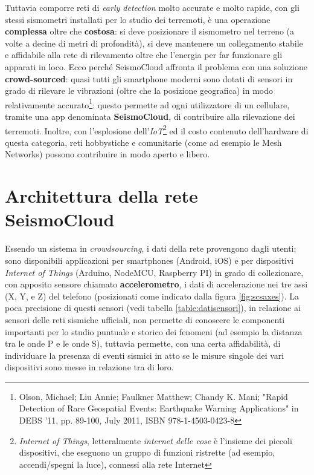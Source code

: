 \documentclass[a4paper,10pt]{memoir}
\begin{document}
Tuttavia comporre reti di \textit{early detection} molto accurate e molto rapide, con gli stessi sismometri installati per lo studio dei terremoti, è una operazione \textbf{complessa} oltre che \textbf{costosa}: si deve posizionare il sismometro nel terreno (a volte a decine di metri di profondità), si deve mantenere un collegamento stabile e affidabile alla rete di rilevamento oltre che l'energia per far funzionare gli apparati in loco. Ecco perché SeismoCloud affronta il problema con una soluzione \textbf{crowd-sourced}: quasi tutti gli smartphone moderni sono dotati di sensori in grado di rilevare le vibrazioni (oltre che la posizione geografica) in modo relativamente accurato\footnote{Olson, Michael; Liu Annie; Faulkner Matthew; Chandy K. Mani; "Rapid Detection of Rare Geospatial Events: Earthquake Warning Applications" in DEBS '11, pp. 89-100, July 2011, ISBN 978-1-4503-0423-8}: questo permette ad ogni utilizzatore di un cellulare, tramite una app denominata \textbf{SeismoCloud}, di contribuire alla rilevazione dei terremoti. Inoltre, con l'esplosione dell'\textit{IoT}\footnote{\textit{Internet of Things}, letteralmente \textit{internet delle cose} è l'insieme dei piccoli dispositivi, che eseguono un gruppo di funzioni ristrette (ad esempio, accendi/spegni la luce), connessi alla rete Internet} ed il costo contenuto dell'hardware di questa categoria, reti hobbystiche e comunitarie (come ad esempio le Mesh Networks) possono contribuire in modo aperto e libero.

\pagebreak
%
%

\section{Architettura della rete SeismoCloud}

Essendo un sistema in \textit{crowdsourcing}, i dati della rete provengono dagli utenti; sono disponibili applicazioni per smartphones (Android, iOS) e per dispositivi \textit{Internet of Things} (Arduino, NodeMCU, Raspberry PI) in grado di collezionare, con apposito sensore chiamato \textbf{accelerometro}, i dati di accelerazione nei tre assi (X, Y, e Z) del telefono (posizionati come indicato dalla figura \ref{fig:scsaxes}). La poca precisione di questi sensori (vedi tabella \ref{table:datisensori}), in relazione ai sensori delle reti sismiche ufficiali, non permette di conoscere le componenti importanti per lo studio puntuale e storico dei fenomeni (ad esempio la distanza tra le onde P e le onde S), tuttavia permette, con una certa affidabilità, di individuare la presenza di eventi sismici in atto se le misure singole dei vari dispositivi sono messe in relazione tra di loro.
\end{document}
